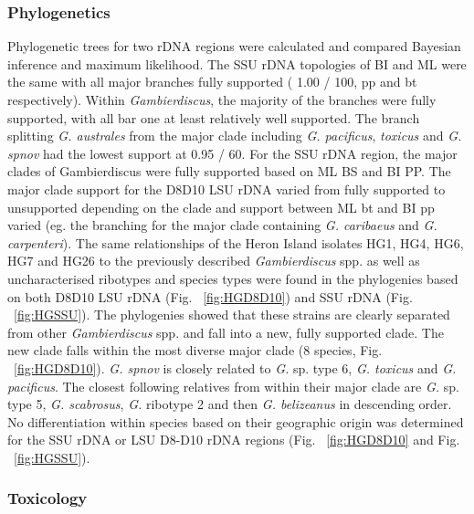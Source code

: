 \documentclass[12pt]{article}
\begin{document}

\subsubsection{Phylogenetics}

Phylogenetic trees for two rDNA regions were calculated and compared Bayesian inference and maximum likelihood. The SSU rDNA  topologies of BI and ML were the same with all major branches fully supported ( 1.00 / 100, pp and bt respectively). Within \emph{Gambierdiscus}, the majority of the branches were fully supported, with all bar one at least relatively well supported. The branch splitting \emph{G. australes} from the major clade including \emph{G. pacificus}, \emph{toxicus} and \emph{G. spnov} had the lowest support at 0.95 / 60.
For the SSU rDNA region, the major clades of Gambierdiscus were fully supported based on ML BS and BI PP. The major clade support for the D8D10 LSU rDNA varied from fully supported to unsupported depending on the clade and support between ML bt and BI pp varied (eg. the branching for the major clade containing \emph{G. caribaeus} and \emph{G. carpenteri}). The same relationships of the Heron Island isolates HG1, HG4, HG6, HG7 and HG26 to the previously described \emph{Gambierdiscus} spp. as well as uncharacterised ribotypes and species types were found in the phylogenies based on both D8D10 LSU rDNA (Fig. ~\ref{fig:HGD8D10}) and SSU rDNA (Fig. ~\ref{fig:HGSSU}). The phylogenies showed that these strains are clearly separated from other \emph{Gambierdiscus} spp. and fall into a new, fully supported clade. The new clade falls within the most diverse major clade (8 species, Fig. ~\ref{fig:HGD8D10}). \emph{G. spnov} is closely related to \emph{G.} sp. type 6, \emph{G. toxicus} and \emph{G. pacificus}. The closest following relatives from within their major clade are \emph{G.} sp. type 5, \emph{G. scabrosus}, \emph{G.} ribotype 2 and then \emph{G. belizeanus} in descending order. \\
No differentiation within species based on their geographic origin was determined for the SSU rDNA or LSU D8-D10 rDNA regions (Fig. ~\ref{fig:HGD8D10} and Fig. ~\ref{fig:HGSSU}).


\subsubsection{Toxicology}
\end{document}
